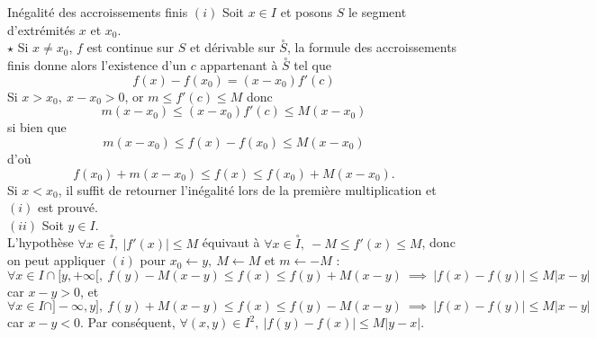 \documentclass{article}
\begin{document}
\begin{question_kholle}
    {Inégalité des accroissements finis}
    $(i)$ Soit $x\in I$ et posons $S$ le segment d'extrémités $x$ et $x_0$. \\
    $\star$ Si $x\neq x_0$, $f$ est continue sur $S$ et dérivable sur $\overset{\circ}{S}$, la formule des accroissements finis donne alors l'existence d'un $c$ appartenant à $\overset{\circ}{S}$ tel que $$f(x) - f(x_0) = (x-x_0)f'(c)$$ Si $x> x_0, \ x-x_0 > 0$, or $m \leq f'(c) \leq M$ donc $$m(x-x_0) \leq (x-x_0)f'(c) \leq M(x-x_0)$$ si bien que $$m(x-x_0) \leq f(x) - f(x_0) \leq M(x-x_0) $$ d'où $$f(x_0) + m(x-x_0) \leq f(x) \leq f(x_0) + M(x-x_0). $$ Si $x<x_0$, il suffit de retourner l'inégalité lors de la première multiplication et $(i)$ est prouvé.\\
    \newline
    $(ii)$ Soit $y \in I.$\\
    L'hypothèse $\forall x\in \overset{\circ}{I}, \ |f'(x)|\leq M$ équivaut à $\forall x \in \overset{\circ}{I}, \ -M \leq f'(x) \leq M$, donc on peut appliquer $(i)$ pour $x_0 \gets y, \ M \gets M$ et $m\gets -M$ : $$\forall x \in I\cap [y, +\infty [,  \ f(y) -M(x-y) \leq f(x) \leq f(y) + M(x-y) \ \implies \ |f(x) -f(y) | \leq M|x-y|$$ car $x-y >0$, et $$\forall x \in I\cap ]-\infty, y ],  \ f(y) +M(x-y) \leq f(x) \leq f(y) - M(x-y) \ \implies \ |f(x) -f(y) | \leq M|x-y|$$ car $x-y < 0$. 
    Par conséquent, $\forall (x,y)\in I^2, \ |f(y) -f(x)| \leq M|y-x|.$
\end{question_kholle}
\end{document}
